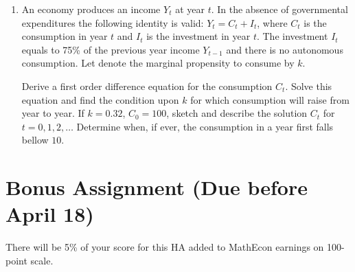 \documentclass[12pt]{article} %
\theoremstyle{definition} %
\begin{document}
\begin{enumerate}
\item An economy produces an income $Y_t$ at year $t$. In the absence of governmental expenditures
the following identity is valid: $Y_t = C_t + I_t$, where $C_t$ is the consumption in year $t$ and $I_t$ is
the investment in year $t$. 
The investment $I_t$ equals to 75\% of the previous year income $Y_{t-1}$
and there is no autonomous consumption. 
Let denote the marginal propensity to consume by $k$.

Derive a first order difference equation for the consumption $C_t$. 
Solve this equation and find the condition upon $k$ for which consumption will raise from year to year. 
If $k = 0.32$, $C_0 = 100$, sketch and describe the solution $C_t$ for $t = 0, 1, 2, \ldots$ 
Determine when, if ever, the consumption in a year first falls bellow $10$.
\end{enumerate}





\section{Bonus Assignment (Due before April 18)}


There will be 5\% of your score for this HA added to MathEcon earnings on 100-point scale.

\medskip
\end{document}
